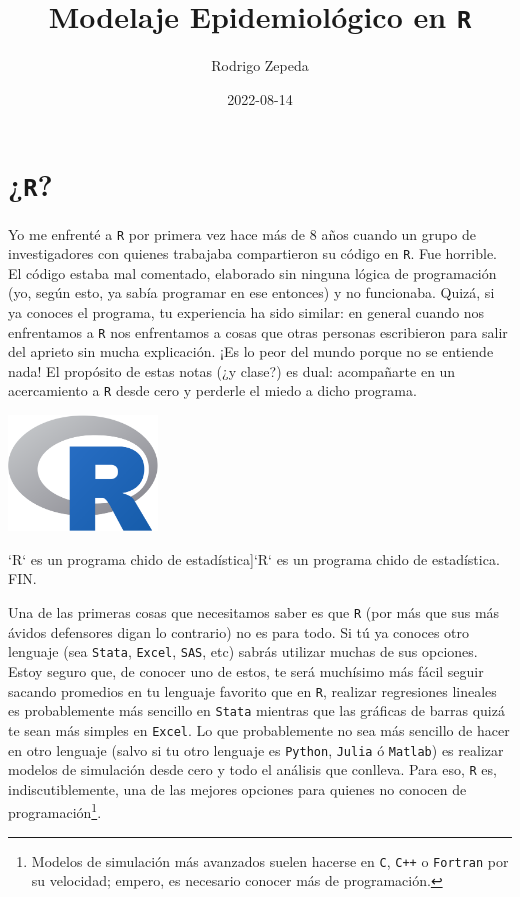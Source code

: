 \documentclass[]{tufte-book}
\title{Modelaje Epidemiológico en \texttt{R}}
\author{Rodrigo Zepeda}
\date{2022-08-14}
\begin{document}
\maketitle




\hypertarget{r}{%
\chapter{\texorpdfstring{¿\texttt{R}?}{¿R?}}\label{r}}

Yo me enfrenté a \texttt{R} por primera vez hace más de 8 años cuando un
grupo de investigadores con quienes trabajaba compartieron su código en
\texttt{R}. Fue horrible. El código estaba mal comentado, elaborado sin
ninguna lógica de programación (yo, según esto, ya sabía programar en
ese entonces) y no funcionaba. Quizá, si ya conoces el programa, tu
experiencia ha sido similar: en general cuando nos enfrentamos a
\texttt{R} nos enfrentamos a cosas que otras personas escribieron para
salir del aprieto sin mucha explicación. ¡Es lo peor del mundo porque no
se entiende nada! El propósito de estas notas (¿y clase?) es dual:
acompañarte en un acercamiento a \texttt{R} desde cero y perderle el
miedo a dicho programa.

\begin{marginfigure}
\includegraphics[width=150px]{images/rlogo} \caption[`R` es un programa chido de estadística]{`R` es un programa chido de estadística. FIN.}\label{fig:unnamed-chunk-1}
\end{marginfigure}

Una de las primeras cosas que necesitamos saber es que \texttt{R} (por
más que sus más ávidos defensores digan lo contrario) no es para todo.
Si tú ya conoces otro lenguaje (sea \texttt{Stata}, \texttt{Excel},
\texttt{SAS}, etc) sabrás utilizar muchas de sus opciones. Estoy seguro
que, de conocer uno de estos, te será muchísimo más fácil seguir sacando
promedios en tu lenguaje favorito que en \texttt{R}, realizar
regresiones lineales es probablemente más sencillo en \texttt{Stata}
mientras que las gráficas de barras quizá te sean más simples en
\texttt{Excel}. Lo que probablemente no sea más sencillo de hacer en
otro lenguaje (salvo si tu otro lenguaje es \texttt{Python},
\texttt{Julia} ó \texttt{Matlab}) es realizar modelos de simulación
desde cero y todo el análisis que conlleva. Para eso, \texttt{R} es,
indiscutiblemente, una de las mejores opciones para quienes no conocen
de programación\footnote{Modelos de simulación más avanzados suelen
  hacerse en \texttt{C}, \texttt{C++} o \texttt{Fortran} por su
  velocidad; empero, es necesario conocer más de programación.}.
\end{document}
